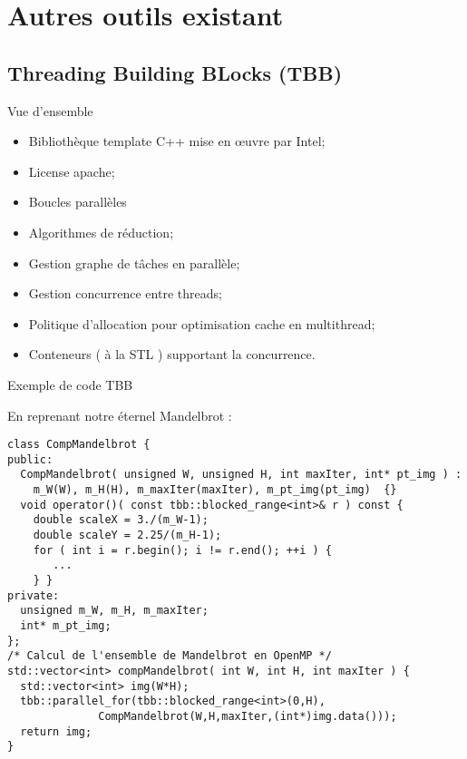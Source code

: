 \documentclass[handout,francais]{beamer}
\begin{document}
\section{Autres outils existant}

\subsection{Threading Building BLocks (TBB)}

\begin{frame}[fragile]{Vue d'ensemble}

\begin{itemize}
 \item Bibliothèque template C++ mise en {\oe}uvre par Intel;
 \item License apache;
 \item Boucles parallèles
 \item Algorithmes de réduction;
 \item Gestion graphe de tâches en parallèle;
 \item Gestion concurrence entre threads;
 \item Politique d'allocation pour optimisation cache en multithread;
 \item Conteneurs ( à la STL ) supportant la concurrence.
\end{itemize}

\end{frame}

\begin{frame}[fragile]{Exemple de code TBB}
 
 En reprenant notre éternel Mandelbrot :

\begin{lstlisting}
class CompMandelbrot {
public:
  CompMandelbrot( unsigned W, unsigned H, int maxIter, int* pt_img ) :
    m_W(W), m_H(H), m_maxIter(maxIter), m_pt_img(pt_img)  {}  
  void operator()( const tbb::blocked_range<int>& r ) const {
    double scaleX = 3./(m_W-1);
    double scaleY = 2.25/(m_H-1);
    for ( int i = r.begin(); i != r.end(); ++i ) {
       ...
    } }
private:
  unsigned m_W, m_H, m_maxIter;
  int* m_pt_img;
};
/* Calcul de l'ensemble de Mandelbrot en OpenMP */
std::vector<int> compMandelbrot( int W, int H, int maxIter ) {
  std::vector<int> img(W*H);
  tbb::parallel_for(tbb::blocked_range<int>(0,H), 
              CompMandelbrot(W,H,maxIter,(int*)img.data()));
  return img;
} 
\end{lstlisting}

\end{frame}
\end{document}

